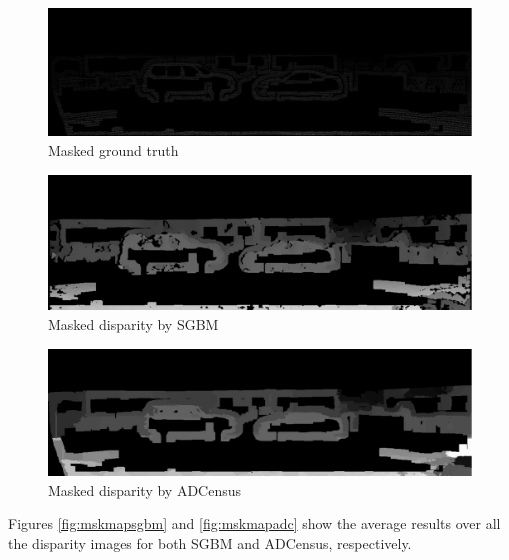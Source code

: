 \begin{figure}[H]
\centering
\includegraphics[scale=0.35]{5gt}
\caption{Masked ground truth}
\label{fig:gtmsk}
\end{figure} 

\begin{figure}[H]
\centering
\includegraphics[scale=0.35]{5mdispsgb}
\caption{Masked disparity by SGBM}
\label{fig:5mdispsgb}
\end{figure} 

\begin{figure}[H]
\centering
\includegraphics[scale=0.35]{5mdispadc}
\caption{Masked disparity by ADCensus}
\label{fig:5mdispadc}
\end{figure} 

\noindent
Figures \ref{fig:mskmapsgbm} and \ref{fig:mskmapadc} show the average results over all the disparity images for both SGBM and ADCensus, respectively.

